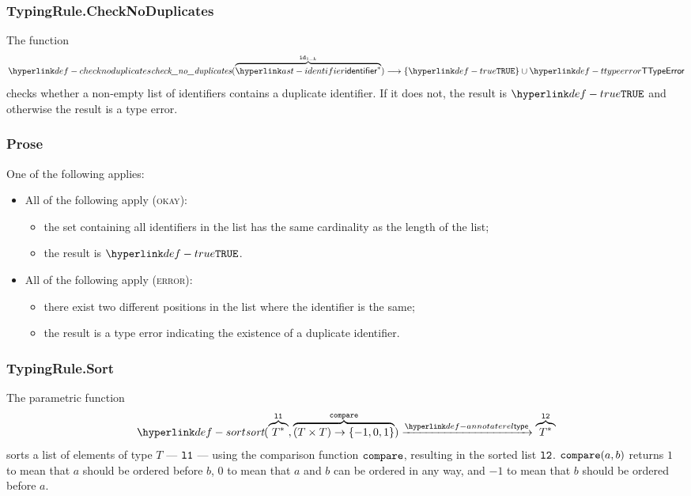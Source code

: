 \subsubsection{TypingRule.CheckNoDuplicates \label{sec:TypingRule.CheckNoDuplicates}}
The function
\[
  \checknoduplicates(\overname{\identifier^*}{\id_{1..k}}) \aslto \{\True\} \cup \TTypeError
\]
checks whether a non-empty list of identifiers contains a duplicate identifier. If it does not, the result
is $\True$ and otherwise the result is a type error.

\subsubsection{Prose}
One of the following applies:
\begin{itemize}
  \item All of the following apply (\textsc{okay}):
  \begin{itemize}
    \item the set containing all identifiers in the list has the same cardinality as the length of the list;
    \item the result is $\True$.
  \end{itemize}

  \item All of the following apply (\textsc{error}):
  \begin{itemize}
    \item there exist two different positions in the list where the identifier is the same;
    \item the result is a type error indicating the existence of a duplicate identifier.
  \end{itemize}
\end{itemize}


\subsubsection{TypingRule.Sort\label{sec:sortinglists}}
\hypertarget{def-sort}{}
The parametric function
\[
\sort(\overname{T^*}{\vlone}, \overname{(T\times T)\rightarrow \{-1,0,1\}}{\compare}) \typearrow \overname{T^*}{\vltwo}
\]
sorts a list of elements of type $T$ --- $\texttt{l1}$ --- using the comparison function $\texttt{compare}$,
resulting in the sorted list $\texttt{l2}$.
$\texttt{compare}(a, b)$ returns $1$ to mean that $a$ should be ordered before $b$,
$0$ to mean that $a$ and $b$ can be ordered in any way,
and $-1$ to mean that $b$ should be ordered before $a$.

